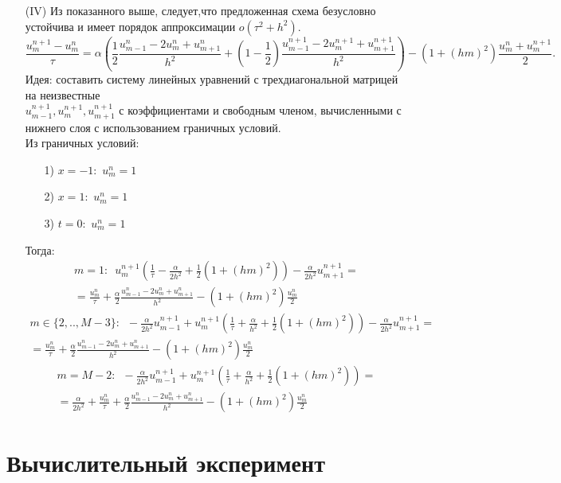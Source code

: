 \documentclass{article}
\theoremstyle{remark}
\theoremstyle{definition}
\begin{document}
\begin{itemize}
	\item[(IV)]Из показанного выше, следует,что предложенная схема безусловно устойчива и имеет порядок аппроксимации  $o(\tau^2+h^2)$.
	$$
	\boxed{ \frac{u^{n+1}_{m}-u^n_m}{\tau} = \alpha\left(\frac 1 2 \frac{u^n_{m-1}-2u^n_m+u^n_{m+1}}{h^2}+(1-\frac 1 2)\frac{u^{n+1}_{m-1}-2u^{n+1}_m+u^{n+1}_{m+1}}{h^2}\right)-\left(1+(hm)^2\right)\frac{u^n_m+u^{n+1}_m}2}.
	$$
	Идея: составить систему линейных уравнений с трехдиагональной матрицей на неизвестные \\$u^{n+1}_{m-1}, u^{n+1}_m, u^{n+1}_{m+1}$ с коэффициентами и свободным членом, вычисленными с нижнего слоя с использованием граничных условий. \\
	Из граничных условий:
	\begin{itemize}
	\item[1)]$x=-1:\,\,u^n_m=1$
	\item[2)]$x=1:\,\,u^n_m=1$
	\item[3)]$t=0:\,\,u^n_m=1$
	\end{itemize}
	Тогда:
	\begin{multline*}
	m=1:\,\,\,u^{n+1}_m\left(\frac {1} {\tau}-\frac \alpha {2h^2}+\frac 1 2(1+(hm)^2)\right)
	-\frac \alpha {2h^2}u^{n+1}_{m+1}=\\
	=\frac{u^n_m}{\tau}+\frac{\alpha}{2}\frac{u^n_{m-1}-2u^n_m+u^n_{m+1}}{h^2}-(1+(hm)^2)\frac{u^n_m}{2}
	\end{multline*}	
	\begin{multline*}
	m\in\{2,..,M-3\}:\,\,\,-\frac \alpha {2h^2}u^{n+1}_{m-1}+u^{n+1}_m\left(\frac {1} {\tau}+\frac \alpha {h^2}+\frac 1 2(1+(hm)^2)\right)
	-\frac \alpha {2h^2}u^{n+1}_{m+1}=\\
	=\frac{u^n_m}{\tau}+\frac{\alpha}{2}\frac{u^n_{m-1}-2u^n_m+u^n_{m+1}}{h^2}-(1+(hm)^2)\frac{u^n_m}{2}
	\end{multline*}	
	\begin{multline*}
	m=M-2:\,\,\,-\frac \alpha {2h^2}u^{n+1}_{m-1}+u^{n+1}_m\left(\frac {1} {\tau}+\frac \alpha {h^2}+\frac 1 2(1+(hm)^2)\right)=\\
	=\frac \alpha {2h^2}+\frac{u^n_m}{\tau}+\frac{\alpha}{2}\frac{u^n_{m-1}-2u^n_m+u^n_{m+1}}{h^2}-(1+(hm)^2)\frac{u^n_m}{2}
	\end{multline*}		
	
	\end{itemize}
	
	\section{Вычислительный эксперимент}\label{Res}
\end{document}
